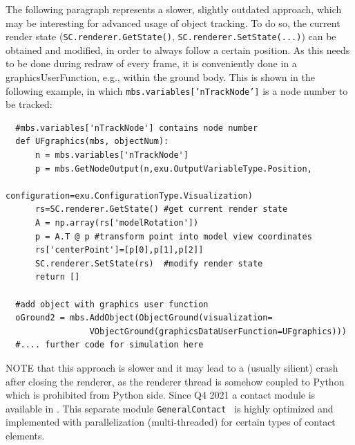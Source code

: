 The following paragraph represents a slower, slightly outdated approach, which may be interesting for advanced usage of object tracking.
To do so, the current render state (\texttt{SC.renderer.GetState()}, \texttt{SC.renderer.SetState(...)}) can be obtained and modified, in order to always follow a certain position.
As this needs to be done during redraw of every frame, it is conveniently done in a graphicsUserFunction, e.g., within the ground body. This is shown in the following example, in which \texttt{mbs.variables['nTrackNode']} is a node number to be tracked:
%
\pythonstyle\begin{lstlisting}
  #mbs.variables['nTrackNode'] contains node number
  def UFgraphics(mbs, objectNum):
      n = mbs.variables['nTrackNode']
      p = mbs.GetNodeOutput(n,exu.OutputVariableType.Position, 
                            configuration=exu.ConfigurationType.Visualization)
      rs=SC.renderer.GetState() #get current render state
      A = np.array(rs['modelRotation'])
      p = A.T @ p #transform point into model view coordinates
      rs['centerPoint']=[p[0],p[1],p[2]]
      SC.renderer.SetState(rs)  #modify render state
      return []

  #add object with graphics user function
  oGround2 = mbs.AddObject(ObjectGround(visualization=
                 VObjectGround(graphicsDataUserFunction=UFgraphics)))
  #.... further code for simulation here
\end{lstlisting}
NOTE that this approach is slower and it may lead to a (usually silient) crash after closing the renderer, as the renderer thread is somehow coupled to Python which is prohibited from Python side.
%
%
Since Q4 2021 a contact module is available in \codeName. 
This separate module \texttt{GeneralContact} \lbrack{}\rbrack\ is highly optimized and implemented with parallelization (multi-threaded) for certain types of contact elements.
%
%
%

